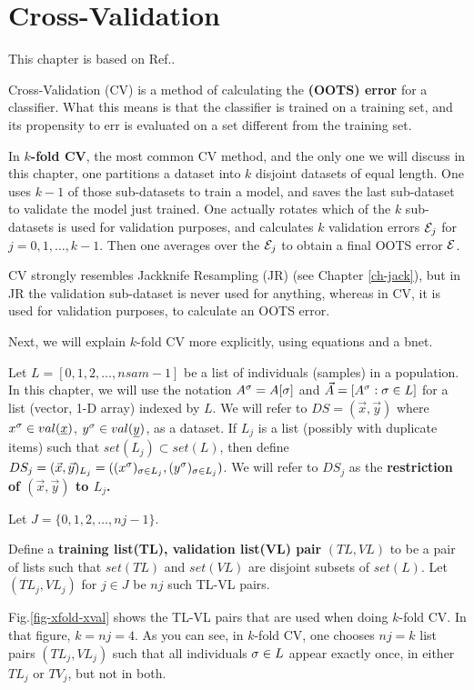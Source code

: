 \chapter{Cross-Validation}
\label{ch-cross-val}

This chapter is based on Ref.\cite{wiki-xval}.

Cross-Validation (CV)
is a method 
of calculating the 
{\bf {} (OOTS) error}
for a classifier.
What this means is that the classifier 
is trained on a training set,
and its propensity to err is evaluated
on a set different from the training set.

In {\bf $k$-fold CV}, the most common CV method, 
and the only one we will discuss in this chapter,
one
partitions a  
dataset into $k$ disjoint datasets
of equal length.
One uses $k-1$ of those
sub-datasets to train a model,
and saves the last sub-dataset to
validate the model just trained.
One actually rotates which of 
the $k$ sub-datasets is used 
for validation purposes,
and calculates $k$ validation 
errors ${\cal E}_j$ for $j=0, 1, \ldots, k-1$.
Then one averages over the ${\cal E}_j$
to obtain a final OOTS error ${\cal E}$. 

CV strongly resembles
Jackknife
Resampling (JR) 
(see Chapter \ref{ch-jack}),
but in JR 
the validation sub-dataset is
never used for anything,
whereas in CV,
it is used for validation
purposes, to calculate
an OOTS error.

Next, we will
explain $k$-fold CV more explicitly,
using 
equations and a bnet.


Let $L=[0,1,2, \ldots, nsam-1]$ be a list of
individuals (samples) in a population.
In this chapter, we will use the notation 
$A^\sigma=A[\sigma]$ 
and $\vec{A}=[A^\sigma:\sigma\in L]$
for a  list (vector, 1-D  array) indexed by $L$.
We will refer to $DS=(\vec{x}, \vec{y})$ 
where $x^\s\in val(\rvx)$, $y^\s\in val(\rvy)$,
as a dataset.
If
$L_j$ is a list (possibly with 
duplicate items)
such that $set(L_j)\subset set(L)$, then
define
$DS_j=(\vec{x}, \vec{y})_{L_j}=
((x^\sigma)_{\sigma\in L_j}, 
(y^\sigma)_{\sigma\in L_j})$.
We will
refer to $DS_j$
as the {\bf restriction of 
$(\vec{x}, \vec{y})$ to $L_j$.}

Let
$J=\{0,1, 2, \ldots, nj-1\}$.

Define a {\bf training list(TL),
validation list(VL) pair} $(TL,VL)$
to be a pair of lists
such that 
$set(TL)$ and $set(VL)$
are disjoint subsets
of $set(L)$.
Let $(TL_j, VL_j)$ for $j\in J$
be $nj$ such TL-VL pairs.


Fig.\ref{fig-xfold-xval} 
shows
the TL-VL pairs 
that are used
when doing $k$-fold 
CV.
In that figure, $k=nj=4$.
As you can see,
in $k$-fold CV, one chooses 
$nj=k$ list pairs $(TL_j, VL_j)$
such that all individuals $\sigma\in L$
appear exactly once, in either
$TL_j$ or $TV_j$, but not in both.

